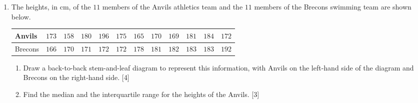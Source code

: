 \documentclass[a4paper]{article}
\begin{document}
\begin{enumerate}
\begin{enumerate}[label=(\roman*)]
		\vspace{3cm}
		
		\item Estimate how many caterpillars had a length of between $2$ and $3.5$ \si{\cm}. \hfill [1]
		
		\vspace{3cm}
		\item $6\%$ of caterpillars were of length $l$ centimetres or more. Estimate $l$. \hfill [2]
		
		\vspace{4cm}
		
		
	\end{enumerate}
	\clearpage
	
	\item 
	
	
	
	The heights, in \si{\cm}, of the $11$ members of the Anvils athletics team and the $11$ members of the Brecons swimming team are shown below.
	
	\medskip
	
	\renewcommand{\arraystretch}{1.2} %
	\begin{tabular}{|l|c|c|c|c|c|c|c|c|c|c|c|}
		\hline
		Anvils  & $ 173 $ & $ 158 $ & $ 180 $ & $ 196$ & $175 $  & $165$ & $170$ & $169$& $181$& $184$ & $172$ \\ 
		\hline
		Brecons & $ 166 $ & $ 170 $ & $ 171 $ & $ 172$ & $172 $  & $178$ & $181$ & $182$& $183$& $183$ & $192$ \\ 
		\hline
	\end{tabular}
	
	\medskip
	
	\begin{enumerate}[label=(\roman*)]
		\item Draw a back-to-back stem-and-leaf diagram to represent this information, with Anvils on the
		left-hand side of the diagram and Brecons on the right-hand side. \hfill [4]
		
		\vspace{8cm}
		
		\item Find the median and the interquartile range for the heights of the Anvils. \hfill [3]
		
		\vspace{6cm}
	\end{enumerate}
	

\end{enumerate}
\end{document}
